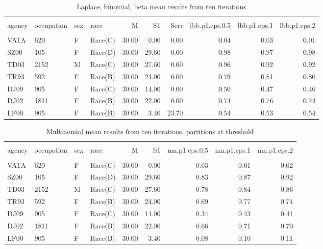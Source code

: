 \documentclass[10pt, letterpaper]{article}
\begin{document}
\begin{spacing}{1.0}
\begin{table}[h!]
    \centering
    \caption{Laplace, binomial, beta mean results from ten iterations}
    \label{table:lbb}
    \begin{tabular}{llllrrrrrr}
        \hline\\[-10pt]
        agency & occupation & sex & race & M & S1 & Serr & lbb.p1.eps.0.5 & lbb.p1.eps.1 & lbb.p1.eps.2 \\ 
        \hline\\[-6pt]
        VATA & 620 & F & Race(C) & 30.00 & 0.00 & 0.00 & 0.04 & 0.03 & 0.01 \\ 
        SZ00 & 105 & F & Race(D) & 30.00 & 29.60 & 0.00 & 0.98 & 0.97 & 0.98 \\ 
        TD03 & 2152 & M & Race(C) & 30.00 & 27.60 & 0.00 & 0.96 & 0.92 & 0.92 \\ 
        TR93 & 592 & F & Race(B) & 30.00 & 24.00 & 0.00 & 0.79 & 0.81 & 0.80 \\ 
        DJ09 & 905 & F & Race(C) & 30.00 & 14.00 & 0.00 & 0.50 & 0.47 & 0.46 \\ 
        DJ02 & 1811 & F & Race(B) & 30.00 & 22.00 & 0.00 & 0.74 & 0.76 & 0.74 \\ 
        LF00 & 905 & F & Race(B) & 30.00 & 3.40 & 23.70 & 0.54 & 0.53 & 0.54 \\ 
        \hline
    \end{tabular}
\end{table}

\begin{table}[h!]
    \centering
    \caption{Multinomial mean results from ten iterations, partitions at threshold}
    \label{table:mn1}
    \begin{tabular}{llllrrrrr}
        \hline\\[-10pt]
        agency & occupation & sex & race & M & S1 & mn.p1.eps.0.5 & mn.p1.eps.1 & mn.p1.eps.2 \\ 
        \hline\\[-6pt]
        VATA & 620 & F & Race(C) & 30.00 & 0.00 & 0.03 & 0.01 & 0.02 \\ 
        SZ00 & 105 & F & Race(D) & 30.00 & 29.60 & 0.83 & 0.87 & 0.92 \\ 
        TD03 & 2152 & M & Race(C) & 30.00 & 27.60 & 0.78 & 0.84 & 0.86 \\ 
        TR93 & 592 & F & Race(B) & 30.00 & 24.00 & 0.69 & 0.77 & 0.74 \\ 
        DJ09 & 905 & F & Race(C) & 30.00 & 14.00 & 0.34 & 0.43 & 0.44 \\ 
        DJ02 & 1811 & F & Race(B) & 30.00 & 22.00 & 0.66 & 0.71 & 0.70 \\ 
        LF00 & 905 & F & Race(B) & 30.00 & 3.40 & 0.08 & 0.10 & 0.11 \\ 
        \hline
    \end{tabular}
\end{table}


\end{spacing}
\end{document}
